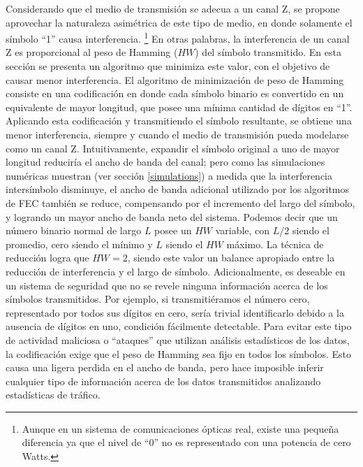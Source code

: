 Considerando que el medio de transmisión se adecua a un canal Z, se propone aprovechar la naturaleza asimétrica de este tipo de medio, en donde solamente el símbolo ``1'' causa interferencia. \footnote{Aunque en un sistema de comunicaciones ópticas real, existe una pequeña diferencia ya que el nivel de ``0'' no es representado con una potencia de cero Watts.}
En otras palabras, la interferencia de un canal Z es proporcional al peso de Hamming ($HW$) del símbolo transmitido.
En esta sección se presenta un algoritmo que minimiza este valor, con el objetivo de causar menor interferencia. El algoritmo de minimización de peso de Hamming consiste en una codificación en donde cada símbolo binario es convertido en un equivalente de mayor longitud, que posee una mínima cantidad de dígitos en ``1''. Aplicando esta codificación y transmitiendo el símbolo resultante, se obtiene una menor interferencia, siempre y cuando el medio de transmisión pueda modelarse como un canal Z.
Intuitivamente, expandir el símbolo original a uno de mayor longitud reduciría el ancho de banda del canal; pero como las simulaciones numéricas muestran (ver sección \ref{simulations}) a medida que la interferencia intersímbolo disminuye, el ancho de banda adicional utilizado por los algoritmos de FEC también se reduce, compensando por el incremento del largo del símbolo, y logrando un mayor ancho de banda neto del sistema.
Podemos decir que un número binario normal de largo $L$ posee un $HW$ variable, con $L/2$ siendo el promedio, cero siendo el mínimo y $L$ siendo el $HW$ máximo.
La técnica de reducción logra que $HW=2$, siendo este valor un balance apropiado entre la reducción de interferencia y el largo de símbolo.
Adicionalmente, es deseable en un sistema de seguridad que no se revele ninguna información acerca de los símbolos transmitidos. Por ejemplo, si transmitiéramos el número cero, representado por todos sus dígitos en cero, sería trivial identificarlo debido a la ausencia de dígitos en uno, condición fácilmente detectable. Para evitar este tipo de actividad maliciosa o ``ataques'' que utilizan análisis estadísticos de los datos, la codificación exige que el peso de Hamming sea fijo en todos los símbolos. Esto causa una ligera perdida en el ancho de banda, pero hace imposible inferir cualquier tipo de información acerca de los datos transmitidos analizando estadísticas de tráfico.

